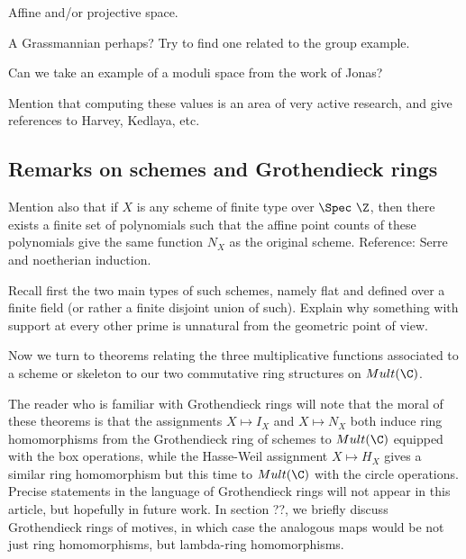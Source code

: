 \begin{example}
Affine and/or projective space.

\end{example}


\begin{example}
A Grassmannian perhaps? Try to find one related to the group example. 

\end{example}


\begin{example}
Can we take an example of a moduli space from the work of Jonas?

\end{example}


Mention that computing these values is an area of very active research, and give references to Harvey, Kedlaya, etc. 



\subsection{Remarks on schemes and Grothendieck rings}

Mention also that if $X$ is any scheme of finite type over $\Spec \ \Z$, then there exists a finite set of polynomials such that the affine point counts of these polynomials give the same function $N_X$ as the original scheme. Reference: Serre and noetherian induction.

Recall first the two main types of such schemes, namely flat and defined over a finite field (or rather a finite disjoint union of such). Explain why something with support at every other prime is unnatural from the geometric point of view.


Now we turn to theorems relating the three multiplicative functions associated to a scheme or skeleton to our two commutative ring structures on $Mult(\C)$. 

The reader who is familiar with Grothendieck rings will note that the moral of these theorems is that the assignments $X \mapsto I_X$ and $X \mapsto N_X$ both induce ring homomorphisms from the Grothendieck ring of schemes to $Mult(\C)$ equipped with the box operations, while the Hasse-Weil assignment $X \mapsto H_X$ gives a similar ring homomorphism but this time to $Mult(\C)$ with the circle operations. Precise statements in the language of Grothendieck rings will not appear in this article, but hopefully in future work. In section ??, we briefly discuss Grothendieck rings of motives, in which case the analogous maps would be not just ring homomorphisms, but lambda-ring homomorphisms.

